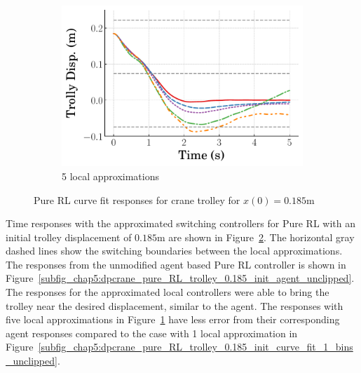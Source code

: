 \begin{figure}
\begin{subfigure}[b]{0.32\textwidth}
    \end{subfigure}
    \hfill
    \begin{subfigure}[b]{0.32\textwidth}
        \centering
        \includegraphics[width=\textwidth]{figures/figures_Interpretability/Mean_ISE_dpcrane_cubic_5_bins/curve_fit_time_responses/pure_RL/curve_fit_0p18_Trolly_Disp.pdf} 
        \caption{5 local approximations}
        \label{subfig_chap5:dpcrane_pure_RL_trolley_0.185_init_curve_fit_5_bins_unclipped}
    \end{subfigure}
    \hfill
    \caption{Pure RL curve fit responses for crane trolley for $x(0)=0.185\si{\meter}$}
    \label{fig_chap5:dpcrane_pure_RL_trolley_0.185_init_unclipped}
\end{figure}
%
Time responses with the approximated switching controllers for Pure RL with an initial trolley displacement of $0.185\si{\meter}$ are shown in Figure~\ref{fig_chap5:dpcrane_pure_RL_trolley_0.185_init_unclipped}. The horizontal gray dashed lines show the switching boundaries between the local approximations. The responses from the unmodified agent based Pure RL controller is shown in Figure~\ref{subfig_chap5:dpcrane_pure_RL_trolley_0.185_init_agent_unclipped}. The responses for the approximated local controllers were able to bring the trolley near the desired displacement, similar to the agent. The responses with five local approximations in Figure~\ref{subfig_chap5:dpcrane_pure_RL_trolley_0.185_init_curve_fit_5_bins_unclipped} have less error from their corresponding agent responses compared to the case with 1 local approximation in Figure~\ref{subfig_chap5:dpcrane_pure_RL_trolley_0.185_init_curve_fit_1_bins_unclipped}.

